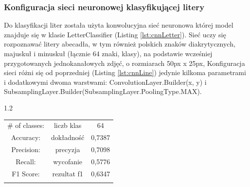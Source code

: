 \documentclass[a4paper,12pt]{article}
\newcommand\spacingInSolemnItemize{1.2}
\newcommand\spacingIndent{2.2em}
\begin{document}
        \subsubsection{Konfiguracja sieci neuronowej klasyfikującej litery}
            \hspace{\spacingIndent}  
            Do klasyfikacji liter została użyta konwolucyjna sieć neuronowa której model znajduje się w klasie LetterClassifier (Listing \ref{lst:cnnLetter}). Sieć  
            uczy się rozpoznawać litery abecadła, w tym również polskich znaków     diakrytycznych, majuskuł i minuskuł (łącznie 64 znaki, klasy), na           podstawie wcześniej przygotowanych jednokanałowych zdjęć,     o rozmiarach 50px x 25px, Konfiguracja sieci różni się od poprzedniej (Listing \ref{lst:cnnLine})    jedynie kilkoma parametrami i dodatkowymi dwoma warstwami:                  ConvolutionLayer.Builder(x, y) i  SubsamplingLayer.Builder(SubsamplingLayer.PoolingType.MAX).
	       \newline
	       
            
            \begin{spacing}{\spacingInSolemnItemize}
                \begin{center}
                \begin{tabular}{ c c c  }
                    \# of classes: &  liczb klas & 64 \\
                    Accuracy:  & dokładność & 0,7387  \\ 
                    Precision:  & precyzja & 0,7098 \\  
                    Recall: & wycofanie & 0,5776      \\
                    F1 Score: & rezultat f1 & 0,6347 \\
                     &  &  
                \end{tabular}
                \end{center}
            \end{spacing}
            
\end{document}

